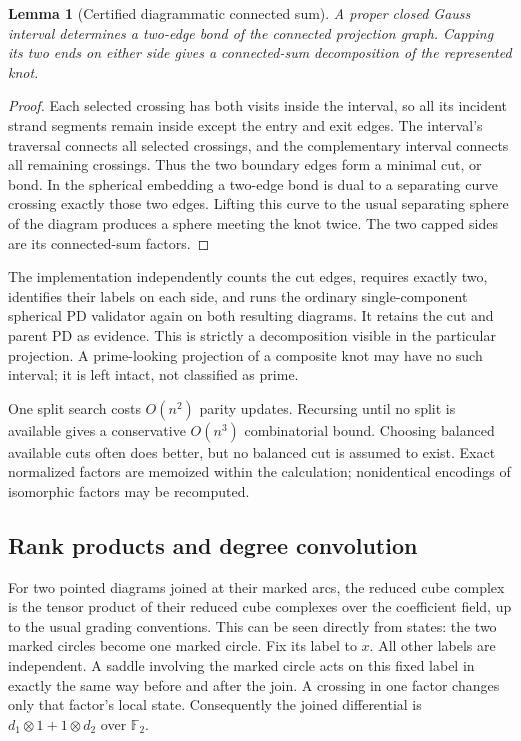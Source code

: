 \documentclass[11pt]{article}
\newtheorem{lemma}[proposition]{Lemma}
\newcommand{\F}{\mathbb F}
\begin{document}
\begin{lemma}[Certified diagrammatic connected sum]
A proper closed Gauss interval determines a two-edge bond of the connected
projection graph. Capping its two ends on either side gives a connected-sum
decomposition of the represented knot.
\end{lemma}
\begin{proof}
Each selected crossing has both visits inside the interval, so all its incident
strand segments remain inside except the entry and exit edges. The interval's
traversal connects all selected crossings, and the complementary interval
connects all remaining crossings. Thus the two boundary edges form a minimal
cut, or bond. In the spherical embedding a two-edge bond is dual to a separating
curve crossing exactly those two edges. Lifting this curve to the usual
separating sphere of the diagram produces a sphere meeting the knot twice.
The two capped sides are its connected-sum factors.
\end{proof}

The implementation independently counts the cut edges, requires exactly two,
identifies their labels on each side, and runs the ordinary single-component
spherical PD validator again on both resulting diagrams. It retains the cut
and parent PD as evidence. This is strictly a decomposition visible in the
particular projection. A prime-looking projection of a composite knot may
have no such interval; it is left intact, not classified as prime.

One split search costs $O(n^2)$ parity updates. Recursing until no split is
available gives a conservative $O(n^3)$ combinatorial bound. Choosing balanced
available cuts often does better, but no balanced cut is assumed to exist.
Exact normalized factors are memoized within the calculation; nonidentical
encodings of isomorphic factors may be recomputed.

\subsection{Rank products and degree convolution}

For two pointed diagrams joined at their marked arcs, the reduced cube complex
is the tensor product of their reduced cube complexes over the coefficient
field, up to the usual grading conventions. This can be seen directly from
states: the two marked circles become one marked circle. Fix its label to $x$.
All other labels are independent. A saddle involving the marked circle acts on
this fixed label in exactly the same way before and after the join. A crossing
in one factor changes only that factor's local state. Consequently the joined
differential is $d_1\otimes1+1\otimes d_2$ over $\F_2$.
\end{document}
